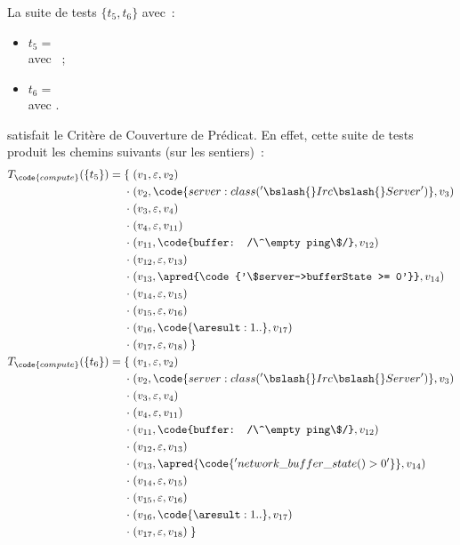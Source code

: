 \begin{example}

La suite de tests $\{t_5, t_6\}$ avec~:
%
\begin{itemize}

\item
$t_5 =$  \\
avec ~;

\item
$t_6 =$  \\
avec .

\end{itemize}
%
satisfait le Critère de Couverture de Prédicat. En effet, cette suite de tests
produit les chemins suivants (sur les sentiers)~:
%
\begin{align*}
%
T_\code{compute}(\{t_5\}) = \{\;
          & (v_1, \varepsilon, v_2) \\
  \cdot\; & (v_2, \code{server: class('\bslash{}Irc\bslash{}Server')}, v_3) \\
  \cdot\; & (v_3, \varepsilon, v_4) \\
  \cdot\; & (v_4, \varepsilon, v_{11}) \\
  \cdot\; & (v_{11}, \code{buffer: /\^\empty ping\$/}, v_{12}) \\
  \cdot\; & (v_{12}, \varepsilon, v_{13}) \\
  \cdot\; & (v_{13}, \apred{\code{'\$server->bufferState >= 0'}}, v_{14}) \\
  \cdot\; & (v_{14}, \varepsilon, v_{15}) \\
  \cdot\; & (v_{15}, \varepsilon, v_{16}) \\
  \cdot\; & (v_{16}, \code{\aresult: 1..}, v_{17}) \\
  \cdot\; & (v_{17}, \varepsilon, v_{18}) \;\} \\
%
T_\code{compute}(\{t_6\}) = \{\;
          & (v_1, \varepsilon, v_2) \\
  \cdot\; & (v_2, \code{server: class('\bslash{}Irc\bslash{}Server')}, v_3) \\
  \cdot\; & (v_3, \varepsilon, v_4) \\
  \cdot\; & (v_4, \varepsilon, v_{11}) \\
  \cdot\; & (v_{11}, \code{buffer: /\^\empty ping\$/}, v_{12}) \\
  \cdot\; & (v_{12}, \varepsilon, v_{13}) \\
  \cdot\; & (v_{13}, \apred{\code{'network\_buffer\_state() > 0'}}, v_{14}) \\
  \cdot\; & (v_{14}, \varepsilon, v_{15}) \\
  \cdot\; & (v_{15}, \varepsilon, v_{16}) \\
  \cdot\; & (v_{16}, \code{\aresult: 1..}, v_{17}) \\
  \cdot\; & (v_{17}, \varepsilon, v_{18}) \;\} \\
%
\end{align*}

\end{example}

